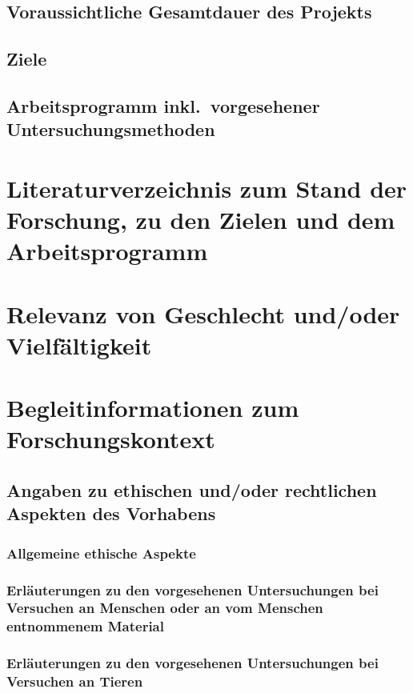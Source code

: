 \documentclass{scrartcl}
\begin{document}
\subsection{Voraussichtliche Gesamtdauer des Projekts}

\subsection{Ziele}

\subsection{Arbeitsprogramm inkl.\ vorgesehener Untersuchungsmethoden}

\section{Literaturverzeichnis zum Stand der Forschung, zu den Zielen und dem Arbeitsprogramm}

\printbibliography[notcategory=reviewed, notcategory=nonreviewed, notcategory=patents_pending, notcategory=patents, heading=none]


\section{Relevanz von Geschlecht und/oder Vielfältigkeit}


\section{Begleitinformationen zum Forschungskontext}

\subsection{Angaben zu ethischen und/oder rechtlichen Aspekten des Vorhabens}

\subsubsection{Allgemeine ethische Aspekte}

\subsubsection{Erläuterungen zu den vorgesehenen Untersuchungen bei Versuchen an Menschen oder an vom Menschen entnommenem Material}

\subsubsection{Erläuterungen zu den vorgesehenen Untersuchungen bei Versuchen an Tieren}
\end{document}
